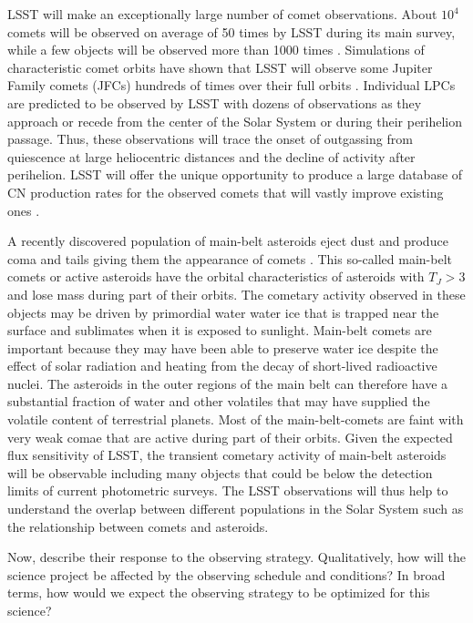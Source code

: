 LSST will make an exceptionally large number of comet
observations.  About $10^4$ comets will be observed on average
of 50 times by LSST during its main survey, while a few objects
will be observed more than 1000 times
\citep{2010PhDT.......241S}.  Simulations of characteristic
comet orbits have shown that LSST will observe some Jupiter
Family comets (JFCs) hundreds of times over their full orbits
\citep{2010PhDT.......241S}.  Individual LPCs are predicted to
be observed by LSST with dozens of observations as they
approach or recede from the center of the Solar System or
during their perihelion passage.  Thus, these observations
will trace the onset of outgassing from quiescence at large
heliocentric distances and the decline of activity after
perihelion.  LSST will offer the unique opportunity to produce
a large database of CN production rates for the observed
comets that will vastly improve existing ones \citep[see
e.g.][]{1995Icar..118..223A,2012ApJ...758...29A}.

A recently discovered population of main-belt asteroids eject
dust and produce coma and tails giving them the appearance of
comets \citep{2012AJ....143...66J}.  This so-called main-belt
comets or active asteroids have the orbital characteristics of
asteroids with $T_J > 3$ and lose mass during part of their
orbits. The cometary activity observed in these objects may be
driven by primordial water water ice that is trapped near the
surface and sublimates when it is exposed to sunlight.
Main-belt comets are important because they may have been able to
preserve water ice despite the effect of solar radiation and
heating from the decay of short-lived radioactive nuclei.  The
asteroids in the outer regions of the main belt can therefore
have a substantial fraction of water and other volatiles that
may have supplied the volatile content of terrestrial planets.
Most of the main-belt-comets are faint with very weak comae
that are active during part of their orbits. Given the
expected flux sensitivity of LSST, the transient cometary
activity of main-belt asteroids will be observable including
many objects that could be below the detection limits of
current photometric surveys.  The LSST observations will thus
help to understand the overlap between different populations
in the Solar System such as the relationship between comets
and asteroids.

Now, describe their response to the observing strategy. Qualitatively,
how will the science project be affected by the observing schedule and
conditions? In broad terms, how would we expect the observing strategy
to be optimized for this science?


